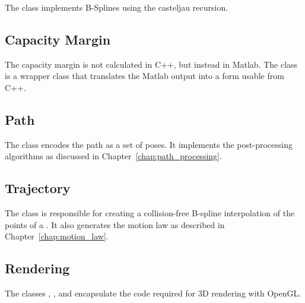 			The  class implements B-Splines using the casteljau
			recursion.

		\subsection{Capacity Margin}

			The capacity margin is not calculated in C++, but instead in Matlab.
			The class  is a wrapper class that translates
			the Matlab output into a form usable from C++.

		\subsection{Path}

			The  class encodes the path as a set of poses. It
			implements the post-processing algorithms as discussed in
			Chapter~\ref{chap:path_processing}.

		\subsection{Trajectory}

			The  class is responsible for creating a
			collision-free B-spline interpolation of the points of a
			. It also generates the motion law as described in
			Chapter~\ref{chap:motion_law}.

		\subsection{Rendering}

			The classes , ,  and
			 encapsulate the code required for 3D rendering with
			OpenGL.


